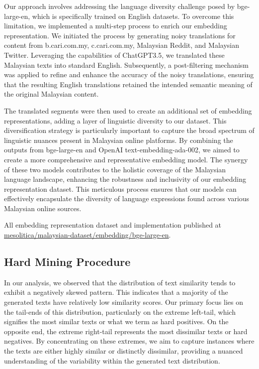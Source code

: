 \documentclass[preprint]{article}
\begin{document}
Our approach involves addressing the language diversity challenge posed by bge-large-en, which is specifically trained on English datasets. To overcome this limitation, we implemented a multi-step process to enrich our embedding representation. We initiated the process by generating noisy translations for content from b.cari.com.my, c.cari.com.my, Malaysian Reddit, and Malaysian Twitter. Leveraging the capabilities of ChatGPT3.5, we translated these Malaysian texts into standard English. Subsequently, a post-filtering mechanism was applied to refine and enhance the accuracy of the noisy translations, ensuring that the resulting English translations retained the intended semantic meaning of the original Malaysian content.

The translated segments were then used to create an additional set of embedding representations, adding a layer of linguistic diversity to our dataset. This diversification strategy is particularly important to capture the broad spectrum of linguistic nuances present in Malaysian online platforms. By combining the outputs from bge-large-en and OpenAI text-embedding-ada-002, we aimed to create a more comprehensive and representative embedding model. The synergy of these two models contributes to the holistic coverage of the Malaysian language landscape, enhancing the robustness and inclusivity of our embedding representation dataset. This meticulous process ensures that our models can effectively encapsulate the diversity of language expressions found across various Malaysian online sources.

All embedding representation dataset and implementation published at \href{https://github.com/mesolitica/malaysian-dataset/tree/master/embedding/bge-large-en}{mesolitica/malaysian-dataset/embedding/bge-large-en}.

\subsection {Hard Mining Procedure}

In our analysis, we observed that the distribution of text similarity tends to exhibit a negatively skewed pattern. This indicates that a majority of the generated texts have relatively low similarity scores. Our primary focus lies on the tail-ends of this distribution, particularly on the extreme left-tail, which signifies the most similar texts or what we term as hard positives. On the opposite end, the extreme right-tail represents the most dissimilar texts or hard negatives. By concentrating on these extremes, we aim to capture instances where the texts are either highly similar or distinctly dissimilar, providing a nuanced understanding of the variability within the generated text distribution.
\end{document}
